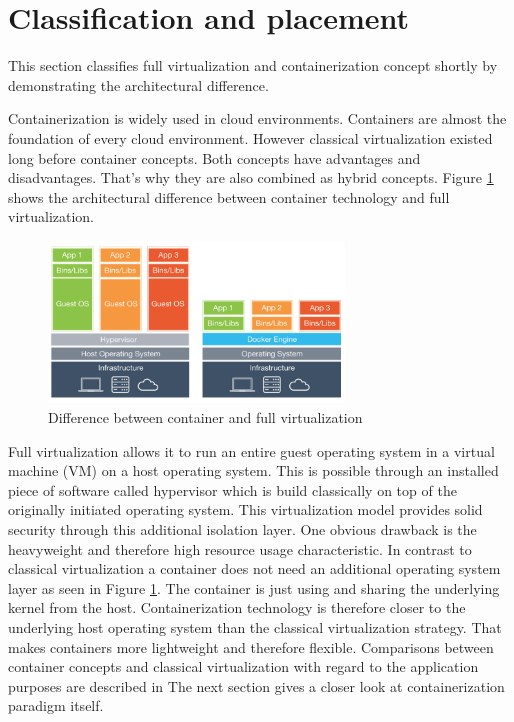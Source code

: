 \section{Classification and placement}
\label{sec:intro:virt_and_cont}
This section classifies full virtualization and containerization concept shortly by demonstrating the architectural difference. 

Containerization is widely used in cloud environments. Containers are almost the foundation of every cloud environment.
However classical virtualization existed long before container concepts. Both concepts have advantages and disadvantages. That's why they are also combined as hybrid concepts.
Figure \ref{fig:intro:diff_container_vm} shows the architectural difference between container technology and full virtualization. 
\begin{figure}[htbp]
 \centering
 \includegraphics[width=0.7\textwidth]{gfx/examples/os_virt_diff}
 \caption{Difference between container and full virtualization}
 \label{fig:intro:diff_container_vm}
\end{figure}
Full virtualization allows it to run an entire guest operating system in a virtual machine (VM) on a host operating system. This is possible through an installed piece of software called hypervisor which is build classically on top of the originally initiated operating system. This virtualization model provides solid security through this additional isolation layer. One obvious drawback is the heavyweight and therefore high resource usage characteristic.
In contrast to classical virtualization a container does not need an additional operating system layer as seen in Figure \ref{fig:intro:diff_container_vm}. The container is just using and sharing the underlying kernel from the host. 
Containerization technology is therefore closer to the underlying host operating system than the classical virtualization strategy. That makes containers more lightweight and therefore flexible. Comparisons between container concepts and classical virtualization with regard to the application purposes are described in \cite{}
The next section gives a closer look at containerization paradigm itself.

